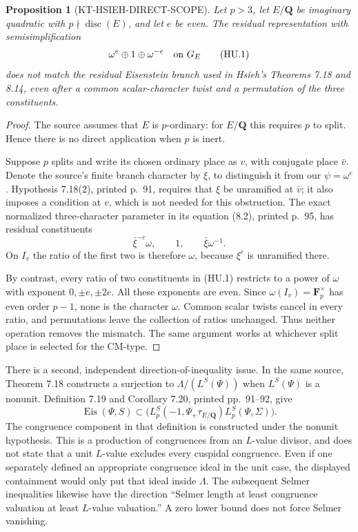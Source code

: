 \documentclass[11pt,a4paper]{article}
\newtheorem{proposition}[theorem]{Proposition}
\theoremstyle{definition}
\begin{document}
\begin{proposition}[KT-HSIEH-DIRECT-SCOPE]
Let $p>3$, let $E/\mathbf Q$ be imaginary quadratic with
$p\nmid\operatorname{disc}(E)$, and let $e$ be even.
The residual representation with semisimplification
\[
       \omega^e\oplus1\oplus\omega^{-e}\quad\hbox{on }G_E
       \tag{HU.1}
\]
does not match the residual Eisenstein branch used in Hsieh's
Theorems 7.18 and 8.14, even after a common scalar-character
twist and a permutation of the three constituents.
\end{proposition}
\begin{proof}
The source assumes that $E$ is $p$-ordinary: for $E/\mathbf Q$
this requires $p$ to split.  Hence there is no direct application
when $p$ is inert.

Suppose $p$ splits and write its chosen ordinary place as $v$,
with conjugate place $\bar v$.  Denote the source's finite branch
character by $\xi$, to distinguish it from our $\psi=\omega^e$.
Hypothesis 7.18(2), printed p.~91, requires that $\xi$ be
unramified at $\bar v$; it also imposes a condition at $v$,
which is not needed for this obstruction.  The exact normalized
three-character parameter in its equation (8.2), printed p.~95,
has residual constituents
\[
       \bar\xi^{-c}\omega,\qquad 1,\qquad
       \bar\xi\omega^{-1}.
       \tag{HU.2}
\]
On $I_v$ the ratio of the first two is therefore $\omega$,
because $\xi^c$ is unramified there.

By contrast, every ratio of two constituents in (HU.1)
restricts to a power of $\omega$ with exponent
$0,\pm e,\pm2e$.  All these exponents are even.
Since $\omega(I_v)=\mathbf F_p^\times$ has even order $p-1$,
none is the character $\omega$.  Common scalar twists cancel
in every ratio, and permutations leave the collection of ratios
unchanged.  Thus neither operation removes the mismatch.
The same argument works at whichever split place is selected
for the CM-type.
\end{proof}

There is a second, independent direction-of-inequality issue.
In the same source, Theorem 7.18 constructs a surjection to
$\Lambda/(L^S(\Psi))$ when $L^S(\Psi)$ is a nonunit.
Definition 7.19 and Corollary 7.20, printed pp.~91--92, give
\[
 \operatorname{Eis}(\Psi,S)
 \subset
 \bigl(L_p^S(-1,\Psi_+\tau_{E/\mathbf Q})
                         L_p^S(\Psi,\Sigma)\bigr).
 \tag{HU.3}
\]
The congruence component in that definition is constructed
under the nonunit hypothesis.  This is a production of
congruences from an $L$-value divisor, and does not state
that a unit $L$-value excludes every cuspidal congruence.
Even if one separately defined an appropriate congruence
ideal in the unit case, the displayed containment would
only put that ideal inside $\Lambda$.
The subsequent Selmer inequalities likewise have the
direction ``Selmer length at least congruence valuation
at least $L$-value valuation.''  A zero lower bound
does not force Selmer vanishing.
\end{document}
